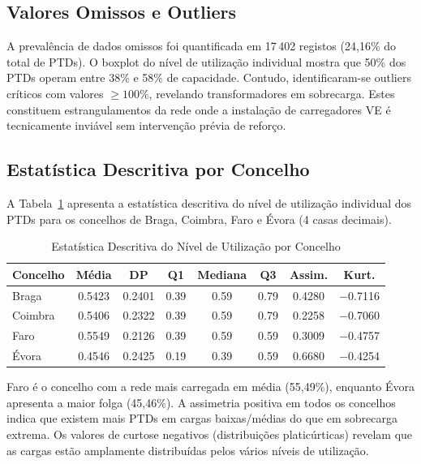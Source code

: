\documentclass[conference]{IEEEtran}
\begin{document}
\subsection{Valores Omissos e Outliers}

A prevalência de dados omissos foi quantificada em 17\,402 registos (24,16\% do total de PTDs). O boxplot do nível de utilização individual mostra que 50\% dos PTDs operam entre 38\% e 58\% de capacidade. Contudo, identificaram-se outliers críticos com valores $\geq 100\%$, revelando transformadores em sobrecarga. Estes constituem estrangulamentos da rede onde a instalação de carregadores VE é tecnicamente inviável sem intervenção prévia de reforço.

\subsection{Estatística Descritiva por Concelho}

A Tabela~\ref{tab:stats_concelhos} apresenta a estatística descritiva do nível de utilização individual dos PTDs para os concelhos de Braga, Coimbra, Faro e Évora (4 casas decimais).

\begin{table}[htbp]
\caption{Estatística Descritiva do Nível de Utilização por Concelho}
\label{tab:stats_concelhos}
\centering
\setlength{\tabcolsep}{3.5pt}
\begin{tabular}{lccccccc}
\hline
\textbf{Concelho} & \textbf{Média} & \textbf{DP} & \textbf{Q1} & \textbf{Mediana} & \textbf{Q3} & \textbf{Assim.} & \textbf{Kurt.} \\
\hline
Braga   & 0.5423 & 0.2401 & 0.39 & 0.59 & 0.79 & 0.4280  & $-$0.7116 \\
Coimbra & 0.5406 & 0.2322 & 0.39 & 0.59 & 0.79 & 0.2258  & $-$0.7060 \\
Faro    & 0.5549 & 0.2126 & 0.39 & 0.59 & 0.59 & 0.3009  & $-$0.4757 \\
Évora   & 0.4546 & 0.2425 & 0.19 & 0.39 & 0.59 & 0.6680  & $-$0.4254 \\
\hline
\end{tabular}
\end{table}

Faro é o concelho com a rede mais carregada em média (55,49\%), enquanto Évora apresenta a maior folga (45,46\%). A assimetria positiva em todos os concelhos indica que existem mais PTDs em cargas baixas/médias do que em sobrecarga extrema. Os valores de curtose negativos (distribuições platicúrticas) revelam que as cargas estão amplamente distribuídas pelos vários níveis de utilização.
\end{document}
